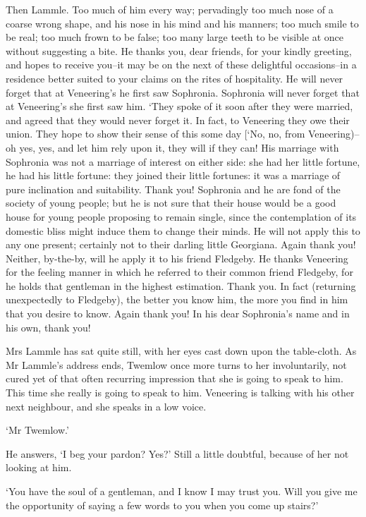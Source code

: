 Then Lammle. Too much of him every way; pervadingly too much nose of a
coarse wrong shape, and his nose in his mind and his manners; too much
smile to be real; too much frown to be false; too many large teeth to be
visible at once without suggesting a bite. He thanks you, dear friends,
for your kindly greeting, and hopes to receive you--it may be on the
next of these delightful occasions--in a residence better suited to
your claims on the rites of hospitality. He will never forget that at
Veneering’s he first saw Sophronia. Sophronia will never forget that at
Veneering’s she first saw him. ‘They spoke of it soon after they
were married, and agreed that they would never forget it. In fact, to
Veneering they owe their union. They hope to show their sense of this
some day [‘No, no, from Veneering)--oh yes, yes, and let him rely
upon it, they will if they can! His marriage with Sophronia was not a
marriage of interest on either side: she had her little fortune, he had
his little fortune: they joined their little fortunes: it was a marriage
of pure inclination and suitability. Thank you! Sophronia and he are
fond of the society of young people; but he is not sure that their house
would be a good house for young people proposing to remain single, since
the contemplation of its domestic bliss might induce them to change
their minds. He will not apply this to any one present; certainly not
to their darling little Georgiana. Again thank you! Neither, by-the-by,
will he apply it to his friend Fledgeby. He thanks Veneering for the
feeling manner in which he referred to their common friend Fledgeby, for
he holds that gentleman in the highest estimation. Thank you. In fact
(returning unexpectedly to Fledgeby), the better you know him, the more
you find in him that you desire to know. Again thank you! In his dear
Sophronia’s name and in his own, thank you!

Mrs Lammle has sat quite still, with her eyes cast down upon the
table-cloth. As Mr Lammle’s address ends, Twemlow once more turns to her
involuntarily, not cured yet of that often recurring impression that she
is going to speak to him. This time she really is going to speak to him.
Veneering is talking with his other next neighbour, and she speaks in a
low voice.

‘Mr Twemlow.’

He answers, ‘I beg your pardon? Yes?’ Still a little doubtful, because
of her not looking at him.

‘You have the soul of a gentleman, and I know I may trust you. Will you
give me the opportunity of saying a few words to you when you come up
stairs?’

